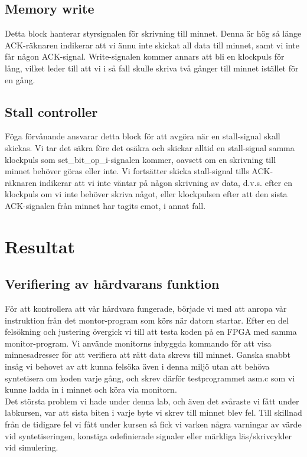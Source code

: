 \documentclass[a4paper]{article}
\begin{document}
\subsection{Memory write}

Detta block hanterar styrsignalen för skrivning till minnet. Denna är
hög så länge ACK-räknaren indikerar att vi ännu inte skickat all data
till minnet, samt vi inte får någon ACK-signal. Write-signalen kommer
annars att bli en klockpuls för lång, vilket leder till att vi i så fall
skulle skriva två gånger till minnet istället för en gång.



\subsection{Stall controller}

Föga förvånande ansvarar detta block för att avgöra när en stall-signal
skall skickas. Vi tar det säkra före det osäkra och skickar alltid en
stall-signal samma klockpuls som set\_bit\_op\_i-signalen kommer,
oavsett om en skrivning till minnet behöver göras eller inte. Vi
fortsätter skicka stall-signal tills ACK-räknaren indikerar att vi inte
väntar på någon skrivning av data, d.v.s. efter en klockpuls om vi inte
behöver skriva något, eller klockpulsen efter att den sista ACK-signalen
från minnet har tagits emot, i annat fall.


\section{Resultat}

\subsection{Verifiering av hårdvarans funktion}

För att kontrollera att vår hårdvara fungerade, började vi med att
anropa vår instruktion från det montor-program som körs när datorn
startar. Efter en del felsökning och justering övergick vi till att
testa koden på en FPGA med samma monitor-program. Vi använde monitorns
inbyggda kommando för att visa minnesadresser för att verifiera att rätt
data skrevs till minnet. Ganska snabbt insåg vi behovet av att kunna
felsöka även i denna miljö utan att behöva syntetisera om koden varje
gång, och skrev därför testprogrammet asm.c som vi kunne ladda in i
minnet och köra via monitorn.\\

Det största problem vi hade under denna lab, och även det svåraste vi
fått under labkursen, var att sista biten i varje byte vi skrev till
minnet blev fel. Till skillnad från de tidigare fel vi fått under kursen
så fick vi varken några varningar av värde vid syntetiseringen, konstiga
odefinierade signaler eller märkliga läs/skrivcykler vid simulering.\\
\end{document}
